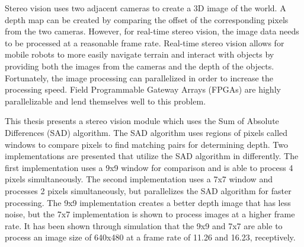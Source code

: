 Stereo vision uses two adjacent cameras to create a 3D image of the world. A depth map can be created by comparing the offset of the corresponding pixels from the two cameras. However, for real-time stereo vision, the image data needs to be processed at a reasonable frame rate. Real-time stereo vision allows for mobile robots to more easily navigate terrain and interact with objects by providing both the images from the cameras and the depth of the objects. Fortunately, the image processing can parallelized in order to increase the processing speed. Field Programmable Gateway Arrays (FPGAs) are highly parallelizable and lend themselves well to this problem.

This thesis presents a stereo vision module which uses the Sum of Absolute Differences (SAD) algorithm. The SAD algorithm uses regions of pixels called windows to compare pixels to find matching pairs for determining depth. Two  implementations are presented that utilize the SAD algorithm in differently. The first implementation uses a 9x9 window for comparison and is able to process 4 pixels simultaneously. The second implementation uses a 7x7 window and processes 2 pixels simultaneously, but parallelizes the SAD algorithm for faster processing. The 9x9 implementation creates a better depth image that has less noise, but the 7x7 implementation is shown to process images at a higher frame rate. It has been shown through simulation that the 9x9 and 7x7 are able to process an image size of 640x480 at a frame rate of 11.26 and 16.23, receptively.


